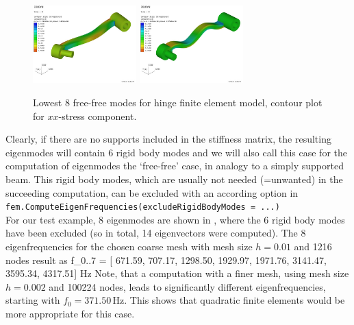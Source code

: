 \begin{figure}[tbph]
\begin{center}
  \includegraphics[width=4cm]{figures/modesHinge/freeFreeModeStress7}
  \includegraphics[width=4cm]{figures/modesHinge/freeFreeModeStress8}
  \end{center}
  \caption{Lowest 8 free-free modes for hinge finite element model, contour plot for $xx$-stress component.}
	\label{fig_hingePartFreeFreeModes}
\end{figure}

Clearly, if there are no supports included in the stiffness matrix, the resulting eigenmodes will contain 6 rigid body modes and we will also call this case for the computation of eigenmodes the `free-free' case, in analogy to a simply supported beam.
This rigid body modes, which are usually not needed (=unwanted) in the succeeding computation, can be excluded with an according option in \vspace{6pt}\\
\texttt{fem.ComputeEigenFrequencies(excludeRigidBodyModes = ...)}
\vspace{12pt}\\
For our test example, 8 eigenmodes are shown in , where the 6 rigid body modes have been excluded (so in total, 14 eigenvectors were computed).
The 8 eigenfrequencies for the chosen coarse mesh with mesh size $h=0.01$ and 1216 nodes result as 
\be
  f_{0..7} = [ 671.59, 707.17, 1298.50, 1929.97, 1971.76, 3141.47, 3595.34, 4317.51] Hz
\ee
Note, that a computation with a finer mesh, using mesh size $h=0.002$ and 100224 nodes, leads to significantly different eigenfrequencies, starting with $f_0=371.50\,$Hz. This shows that quadratic finite elements would be more appropriate for this case.

